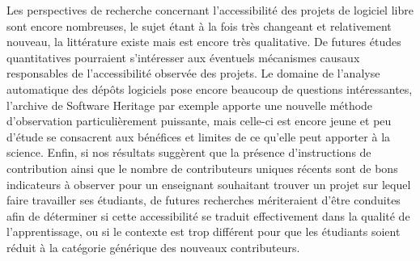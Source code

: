 \documentclass[dvipsnames,runningheads]{llncs}
\begin{document}
    Les perspectives de recherche concernant l'accessibilité des projets de logiciel libre sont encore
    nombreuses, le sujet étant à la fois très changeant et relativement nouveau, la littérature existe mais
    est encore très qualitative. De futures études quantitatives pourraient s'intéresser aux éventuels
    mécanismes causaux responsables de l'accessibilité observée des projets. Le domaine de l'analyse
    automatique des dépôts logiciels pose encore beaucoup de questions intéressantes, l'archive de Software
    Heritage par exemple apporte une nouvelle méthode d'observation particulièrement puissante, mais celle-ci
    est encore jeune et peu d'étude se consacrent aux bénéfices et limites de ce qu'elle peut apporter à la
    science. Enfin, si nos résultats suggèrent que la présence d'instructions de contribution ainsi que le
    nombre de contributeurs uniques récents sont de bons indicateurs à observer pour un enseignant souhaitant
    trouver un projet sur lequel faire travailler ses étudiants, de futures recherches mériteraient d'être
    conduites afin de déterminer si cette accessibilité se traduit effectivement dans la qualité de
    l'apprentissage, ou si le contexte est trop différent pour que les étudiants soient réduit à la catégorie
    générique des nouveaux contributeurs.

    \printbibliography[heading=bibintoc]
\end{document}

